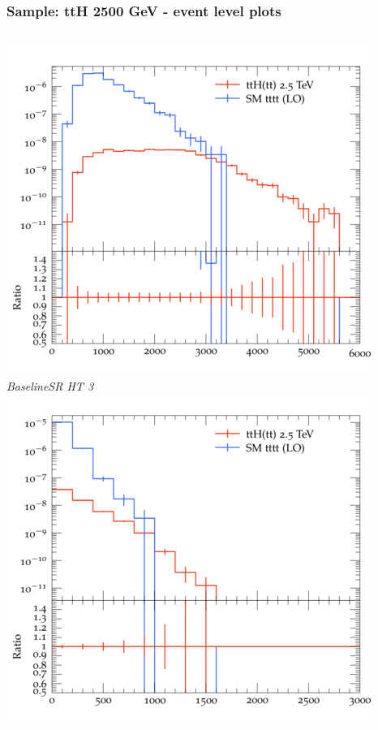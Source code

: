 \documentclass{beamer}
\begin{document}
\begin{frame}
\frametitle{Sample: ttH 2500 GeV - event level plots}
\begin{columns}
\includegraphics[width=\textwidth]{../plots/ttH_2500/tttt_ttH_1LOS/BaselineSR_HT_3.png}\\
\textit{\small BaselineSR HT 3}
\includegraphics[width=\textwidth]{../plots/ttH_2500/tttt_ttH_1LOS/BaselineSR_MET.png}\\

\end{columns}
\end{frame}
\end{document}
